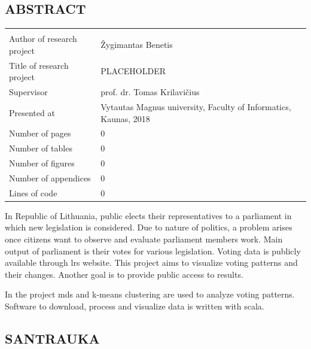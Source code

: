 \documentclass[a4paper,12pt]{article}
\begin{document}
	
	
	
	\begin{center}
		\section*{ABSTRACT}
	\end{center}
	
	
	
	\noindent
	\begin{center}
		\begin{tabular}{L{4.5cm} L{8cm}}
			\\ 
			Author of research project & Žygimantas Benetis \\
			Title of research project & PLACEHOLDER\\
			Supervisor & prof. dr. Tomas Krilavičius\\
			Presented at & Vytautas Magnus university, Faculty of Informatics, Kaunas, 2018\\
			Number of pages & 0\\
			Number of tables & 0\\
			Number of figures & 0\\
			Number of appendices & 0\\
			Lines of code & 0\\
		\end{tabular}
	\end{center} 
	
	\vspace{5mm}
	
	In Republic of Lithuania, public elects their representatives to a parliament in which new legislation is considered. Due to nature of politics, a problem arises once citizens want to observe and evaluate parliament members work. Main output of parliament is their votes for various legislation. Voting data is publicly available through \gls{lrs} website. This project aims to visualize voting patterns and their changes. Another goal is to provide public access to results.
	
	In the project \gls{mds} and \gls{k-means} clustering are used to analyze voting patterns. Software to download, process and visualize  data is written with \gls{scala}.
	
	
	\clearpage
	
	\begin{center}
		\section*{SANTRAUKA}
	\end{center}
	
\end{document}
